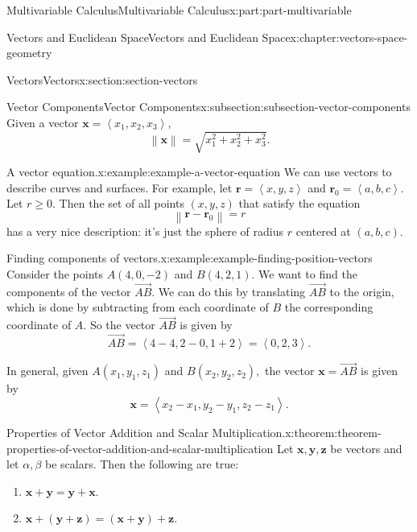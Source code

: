 \documentclass[twoside,10pt,]{book}
\numberwithin{equation}{part}
\newcommand{\norm}[1]{\left\| #1 \right\|}
\newcommand{\dotprod}[1]{\left\langle #1 \right\rangle}
\begin{document}
\begin{partptx}{Multivariable Calculus}{}{Multivariable Calculus}{}{}{x:part:part-multivariable}
\begin{chapterptx}{Vectors and Euclidean Space}{}{Vectors and Euclidean Space}{}{}{x:chapter:vectors-space-geometry}
\begin{sectionptx}{Vectors}{}{Vectors}{}{}{x:section:section-vectors}
\begin{subsectionptx}{Vector Components}{}{Vector Components}{}{}{x:subsection:subsection-vector-components}
Given a vector \(\mathbf{x} = \dotprod{x_{1},x_{2},x_{3}},\)%
\begin{equation*}
\norm{\mathbf{x}} = \sqrt{x_{1}^{2}+x_{2}^{2}+x_{3}^{2}}.
\end{equation*}
%
\begin{example}{A vector equation.}{x:example:example-a-vector-equation}%
We can use vectors to describe curves and surfaces. For example, let \(\mathbf{r} = \dotprod{x,y,z}\) and \(\mathbf{r}_{0} = \dotprod{a,b,c}\). Let \(r\geq0\). Then the set of all points \((x,y,z)\) that satisfy the equation%
\begin{equation*}
\norm{\mathbf{r}-\mathbf{r}_{0}} = r
\end{equation*}
has a very nice description: it's just the sphere of radius \(r\) centered at \((a,b,c)\).%
\end{example}
\begin{example}{Finding components of vectors.}{x:example:example-finding-position-vectors}%
Consider the points \(A(4,0,-2)\) and \(B(4,2,1)\). We want to find the components of the vector \(\overrightarrow{AB}\). We can do this by translating \(\overrightarrow{AB}\) to the origin, which is done by subtracting from each coordinate of \(B\) the corresponding coordinate of \(A\). So the vector \(\overrightarrow{AB}\) is given by%
%
\begin{equation*}
\overrightarrow{AB} = \dotprod{4-4,2-0,1+2} = \dotprod{0,2,3}.
\end{equation*}
\end{example}
In general, given \(A(x_{1},y_{1},z_{1})\) and \(B(x_{2},y_{2},z_{2}),\) the vector \(\mathbf{x} = \overrightarrow{AB}\) is given by%
%
\begin{equation*}
\mathbf{x} = \dotprod{x_{2}-x_{1},y_{2}-y_{1},z_{2}-z_{1}}.
\end{equation*}
\begin{theorem}{Properties of Vector Addition and Scalar Multiplication.}{}{x:theorem:theorem-properties-of-vector-addition-and-scalar-multiplication}%
%
Let \(\mathbf{x},\mathbf{y},\mathbf{z}\) be vectors and let \(\alpha,\beta\) be scalars. Then the following are true:%
%
\begin{multicols}{2}
\begin{enumerate}
\item{}\(\mathbf{x}+\mathbf{y} = \mathbf{y}+\mathbf{x}\).%
\item{}\(\displaystyle \mathbf{x}+(\mathbf{y}+\mathbf{z}) = (\mathbf{x}+\mathbf{y})+\mathbf{z}.\)%

\end{enumerate}
\end{multicols}
\end{theorem}
\end{subsectionptx}
\end{sectionptx}
\end{chapterptx}
\end{partptx}
\end{document}
